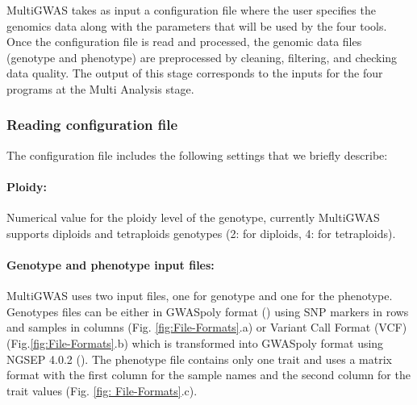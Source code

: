 \documentclass{article}
\begin{document}
MultiGWAS takes as input a configuration file where the user specifies the genomics data along with the parameters that will be used by the four tools. Once the configuration file is read and processed, the genomic data files (genotype and phenotype) are preprocessed by cleaning, filtering, and checking data quality. The output of this stage corresponds to the inputs for the four programs at the Multi Analysis stage.


\subsubsection{Reading configuration file\label{section-Reading-configuration-file}}

The configuration file includes the following settings that we briefly describe:%

\paragraph{{Ploidy:}} Numerical value for the ploidy level of the genotype, currently MultiGWAS supports diploids and tetraploids genotypes (2: for diploids, 4: for tetraploids).

\paragraph{{Genotype and phenotype input files:}}

MultiGWAS uses two input files, one for genotype and one for the phenotype. Genotypes files can be either in GWASpoly format (\cite{Rosyara2016}) using SNP markers in rows and samples in columns (Fig. \ref{fig:File-Formats}.a) or Variant Call Format (VCF) (Fig.\ref{fig:File-Formats}.b) which is transformed into GWASpoly format using NGSEP 4.0.2 (\cite{Duitama2019}). The phenotype file contains only one trait and uses a matrix format with the first column for the sample names and the second column for the trait values (Fig. \ref{fig: File-Formats}.c).
\end{document}
